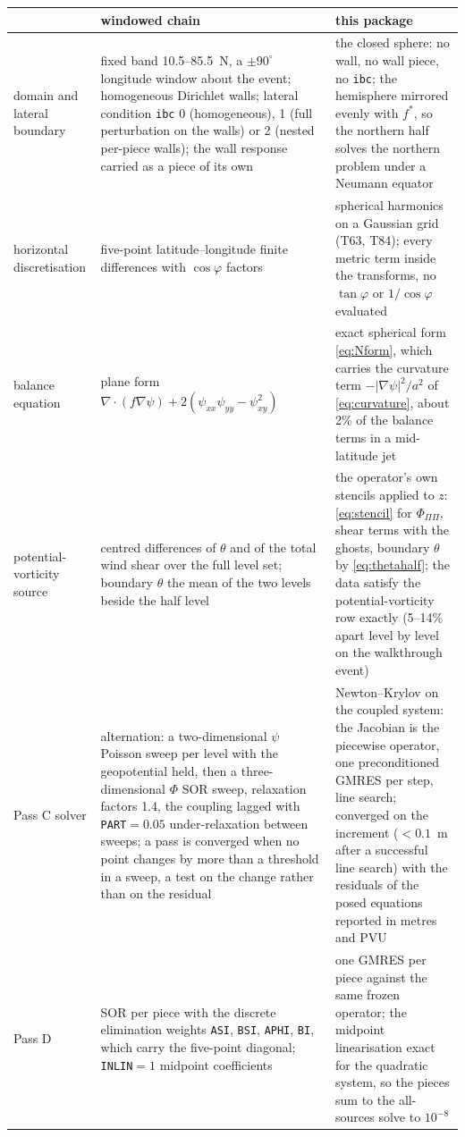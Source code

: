 \documentclass[11pt,a4paper]{article}
\newcommand{\grad}{\nabla}
\newcommand{\code}[1]{\texttt{#1}}
\begin{document}
\begin{center}
\small
\begin{tabularx}{\linewidth}{>{\raggedright\arraybackslash}p{2.5cm}LL}
\toprule
 & windowed chain & this package \\
\midrule
domain and lateral boundary &
fixed band 10.5--85.5~N, a $\pm90^\circ$ longitude window about the event;
homogeneous Dirichlet walls; lateral condition \code{ibc} 0 (homogeneous), 1
(full perturbation on the walls) or 2 (nested per-piece walls); the wall
response carried as a piece of its own &
the closed sphere: no wall, no wall piece, no \code{ibc}; the hemisphere
mirrored evenly with $f^{*}$, so the northern half solves the northern problem
under a Neumann equator \\
\midrule
horizontal discretisation &
five-point latitude--longitude finite differences with $\cos\varphi$ factors &
spherical harmonics on a Gaussian grid (T63, T84); every metric term inside the
transforms, no $\tan\varphi$ or $1/\cos\varphi$ evaluated \\
\midrule
balance equation &
plane form $\grad\cdot(f\grad\psi) + 2(\psi_{xx}\psi_{yy}-\psi_{xy}^2)$ &
exact spherical form \eqref{eq:Nform}, which carries the curvature term
$-|\grad\psi|^2/a^2$ of \eqref{eq:curvature}, about 2\% of the balance terms in
a mid-latitude jet \\
\midrule
potential-vorticity source &
centred differences of $\theta$ and of the total wind shear over the full level
set; boundary $\theta$ the mean of the two levels beside the half level &
the operator's own stencils applied to $z$: \eqref{eq:stencil} for
$\Phi_{\Pi\Pi}$, shear terms with the ghosts, boundary $\theta$ by
\eqref{eq:thetahalf}; the data satisfy the potential-vorticity row exactly
(5--14\% apart level by level on the walkthrough event) \\
\midrule
Pass C solver &
alternation: a two-dimensional $\psi$ Poisson sweep per level with the
geopotential held, then a three-dimensional $\Phi$ SOR sweep, relaxation
factors 1.4, the coupling lagged with \code{PART}$=0.05$ under-relaxation
between sweeps; a pass is converged when no point changes by more than a
threshold in a sweep, a test on the change rather than on the residual &
Newton--Krylov on the coupled system: the Jacobian is the piecewise operator,
one preconditioned GMRES per step, line search; converged on the increment
($<0.1$~m after a successful line search) with the residuals of the posed
equations reported in metres and PVU \\
\midrule
Pass D &
SOR per piece with the discrete elimination weights \code{ASI}, \code{BSI},
\code{APHI}, \code{BI}, which carry the five-point diagonal; \code{INLIN}$=1$
midpoint coefficients &
one GMRES per piece against the same frozen operator; the midpoint
linearisation exact for the quadratic system, so the pieces sum to the
all-sources solve to $10^{-8}$ \\
\bottomrule
\end{tabularx}
\end{center}
\end{document}
